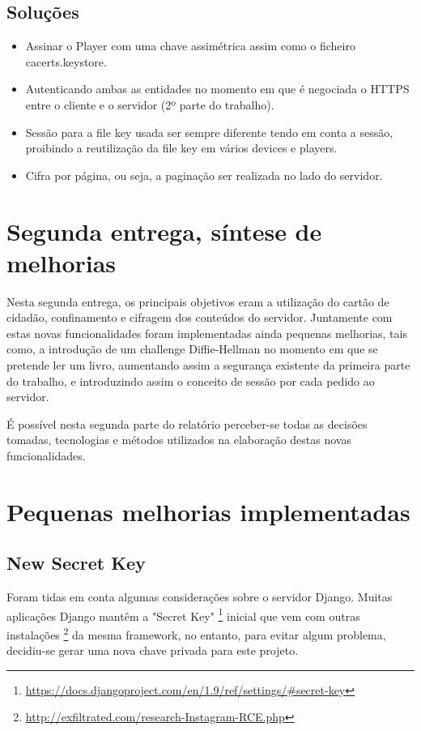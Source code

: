 \documentclass[pdftex,12pt,a4paper]{report}
\begin{document}
\subsection{Soluções}

\begin{itemize}
\item Assinar o Player com uma chave assimétrica assim como o ficheiro cacerts.keystore.
\item Autenticando ambas as entidades no momento em que é negociada o HTTPS entre o cliente e o servidor (2º parte do trabalho).
\item Sessão para a file key usada ser sempre diferente tendo em conta a sessão, proibindo a reutilização da file key em vários devices e players.
\item Cifra por página, ou seja, a paginação ser realizada no lado do servidor.
\end{itemize}

\newpage

\section{Segunda entrega, síntese de melhorias}

Nesta segunda entrega, os principais objetivos eram a utilização do cartão de cidadão, confinamento e cifragem dos conteúdos do servidor. Juntamente com estas novas funcionalidades foram implementadas ainda pequenas melhorias, tais como, a introdução de um challenge Diffie-Hellman no momento em que se pretende ler um livro, aumentando assim a segurança existente da primeira parte do trabalho, e introduzindo assim o conceito de sessão por cada pedido ao servidor.

É possível nesta segunda parte do relatório perceber-se todas as decisões tomadas, tecnologias e métodos utilizados na elaboração destas novas funcionalidades.
\section{Pequenas melhorias implementadas}

\subsection{New Secret Key}
Foram tidas em conta algumas considerações sobre o servidor Django. Muitas aplicações Django mantêm a "Secret Key" \footnote{\label{url1} \url{https://docs.djangoproject.com/en/1.9/ref/settings/\#secret-key}} inicial que vem com outras instalações \footnote{\label{url1} \url{http://exfiltrated.com/research-Instagram-RCE.php}} da mesma framework, no entanto, para evitar algum problema, decidiu-se gerar uma nova chave privada para este projeto. 
\end{document}

